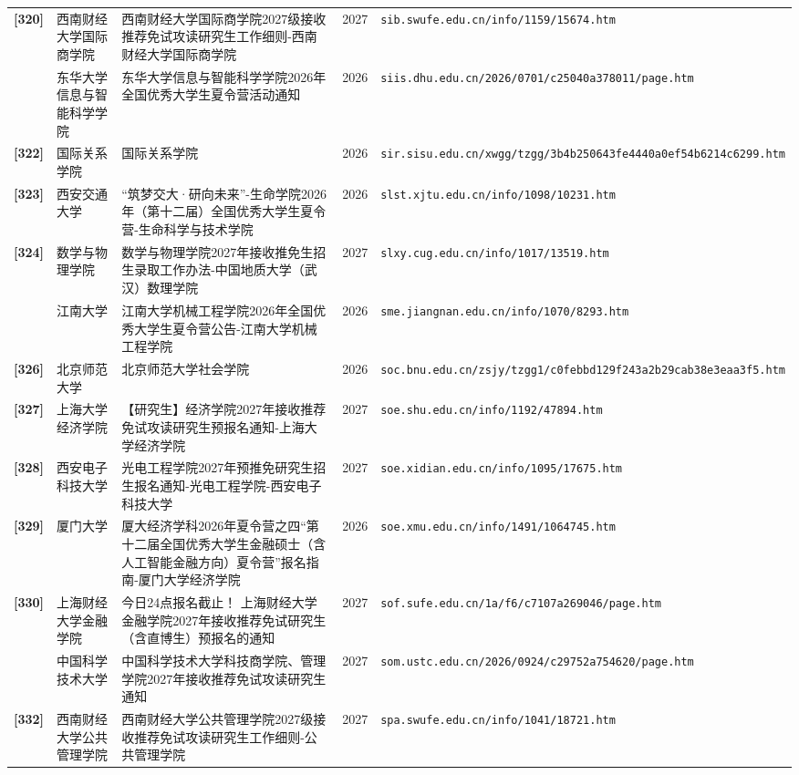 {\begin{longtable}{@{}p{1.15cm}p{2.9cm}p{6.3cm}p{0.85cm}p{5.0cm}@{}}
\textbf{[320]} & 西南财经大学国际商学院 & 西南财经大学国际商学院2027级接收推荐免试攻读研究生工作细则-西南财经大学国际商学院 & 2027 & \texttt{sib.swufe.edu.cn/info/1159/15674.htm} \\
[321] & 东华大学信息与智能科学学院 & 东华大学信息与智能科学学院2026年全国优秀大学生夏令营活动通知 & 2026 & \texttt{siis.dhu.edu.cn/2026/0701/c25040a378011/page.htm} \\
\textbf{[322]} & 国际关系学院 & 国际关系学院 & 2026 & \texttt{sir.sisu.edu.cn/xwgg/tzgg/3b4b250643fe4440a0ef54b6214c6299.htm} \\
\textbf{[323]} & 西安交通大学 & “筑梦交大·研向未来”-生命学院2026年（第十二届）全国优秀大学生夏令营-生命科学与技术学院 & 2026 & \texttt{slst.xjtu.edu.cn/info/1098/10231.htm} \\
\textbf{[324]} & 数学与物理学院 & 数学与物理学院2027年接收推免生招生录取工作办法-中国地质大学（武汉）数理学院 & 2027 & \texttt{slxy.cug.edu.cn/info/1017/13519.htm} \\
[325] & 江南大学 & 江南大学机械工程学院2026年全国优秀大学生夏令营公告-江南大学机械工程学院 & 2026 & \texttt{sme.jiangnan.edu.cn/info/1070/8293.htm} \\
\textbf{[326]} & 北京师范大学 & 北京师范大学社会学院 & 2026 & \texttt{soc.bnu.edu.cn/zsjy/tzgg1/c0febbd129f243a2b29cab38e3eaa3f5.htm} \\
\textbf{[327]} & 上海大学经济学院 & 【研究生】经济学院2027年接收推荐免试攻读研究生预报名通知-上海大学经济学院 & 2027 & \texttt{soe.shu.edu.cn/info/1192/47894.htm} \\
\textbf{[328]} & 西安电子科技大学 & 光电工程学院2027年预推免研究生招生报名通知-光电工程学院-西安电子科技大学 & 2027 & \texttt{soe.xidian.edu.cn/info/1095/17675.htm} \\
\textbf{[329]} & 厦门大学 & 厦大经济学科2026年夏令营之四“第十二届全国优秀大学生金融硕士（含人工智能金融方向）夏令营”报名指南-厦门大学经济学院 & 2026 & \texttt{soe.xmu.edu.cn/info/1491/1064745.htm} \\
\textbf{[330]} & 上海财经大学金融学院 & 今日24点报名截止！\textbar{} 上海财经大学金融学院2027年接收推荐免试研究生（含直博生）预报名的通知 & 2027 & \texttt{sof.sufe.edu.cn/1a/f6/c7107a269046/page.htm} \\
[331] & 中国科学技术大学 & 中国科学技术大学科技商学院、管理学院2027年接收推荐免试攻读研究生通知 & 2027 & \texttt{som.ustc.edu.cn/2026/0924/c29752a754620/page.htm} \\
\textbf{[332]} & 西南财经大学公共管理学院 & 西南财经大学公共管理学院2027级接收推荐免试攻读研究生工作细则-公共管理学院 & 2027 & \texttt{spa.swufe.edu.cn/info/1041/18721.htm} \\

\end{longtable}}
